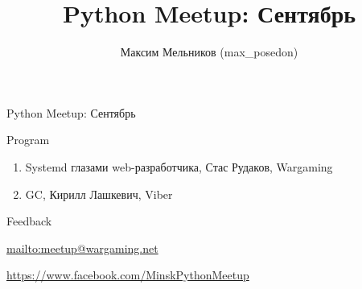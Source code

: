 \documentclass[aspectratio=169]{beamer}
\begin{document}
\title{Python Meetup: Сентябрь}
\author{Максим Мельников (max\_posedon)}
\date{}

\begin{frame}{Python Meetup: Сентябрь}
    \begin{block}{Program}
    \begin{enumerate}
        \item Systemd глазами web-разработчика, Стас Рудаков, Wargaming
        \item GC, Кирилл Лашкевич, Viber
    \end{enumerate}
    \end{block}

    \begin{block}{Feedback}
    \par \url{mailto:meetup@wargaming.net}
    \par \url{https://www.facebook.com/MinskPythonMeetup}
    \end{block}
\end{frame}
\end{document}
